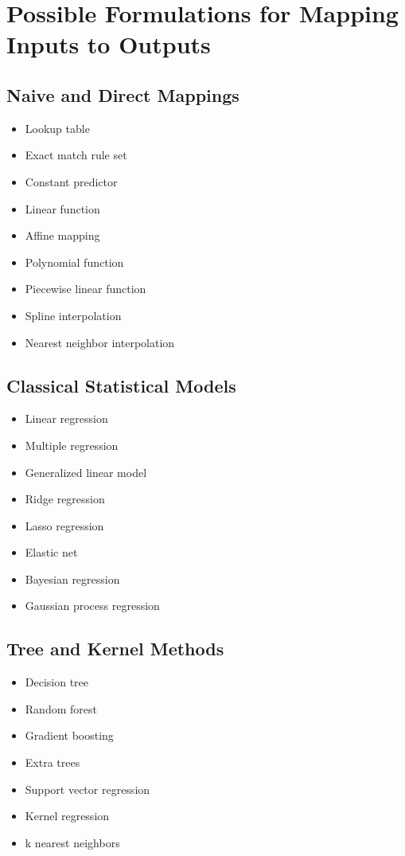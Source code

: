 \documentclass{article}
\begin{document}
\section*{Possible Formulations for Mapping Inputs to Outputs}

\subsection*{Naive and Direct Mappings}
\begin{itemize}
\item Lookup table
\item Exact match rule set
\item Constant predictor
\item Linear function
\item Affine mapping
\item Polynomial function
\item Piecewise linear function
\item Spline interpolation
\item Nearest neighbor interpolation
\end{itemize}

\subsection*{Classical Statistical Models}
\begin{itemize}
\item Linear regression
\item Multiple regression
\item Generalized linear model
\item Ridge regression
\item Lasso regression
\item Elastic net
\item Bayesian regression
\item Gaussian process regression
\end{itemize}

\subsection*{Tree and Kernel Methods}
\begin{itemize}
\item Decision tree
\item Random forest
\item Gradient boosting
\item Extra trees
\item Support vector regression
\item Kernel regression
\item k nearest neighbors
\end{itemize}
\end{document}
